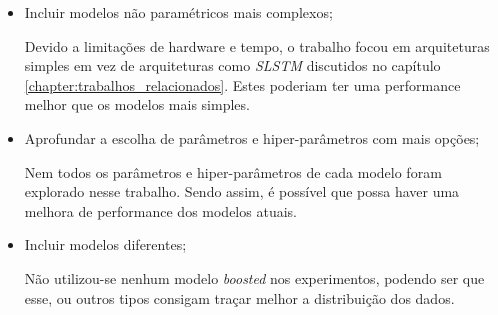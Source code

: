 \begin{itemize}
    \item Incluir modelos não paramétricos mais complexos;
    
    Devido a limitações de hardware e tempo, o trabalho focou em arquiteturas simples em vez de arquiteturas como \textit{\acrshort{SLSTM}} discutidos no capítulo \ref{chapter:trabalhos_relacionados}. Estes poderiam ter uma performance melhor que os modelos mais simples.
    
    \item Aprofundar a escolha de parâmetros e hiper-parâmetros com mais opções;
    
    Nem todos os parâmetros e hiper-parâmetros de cada modelo foram explorado nesse trabalho. Sendo assim, é possível que possa haver uma melhora de performance dos modelos atuais.
    
    \item Incluir modelos diferentes;
    
    Não utilizou-se nenhum modelo \textit{boosted} nos experimentos, podendo ser que esse, ou outros tipos consigam traçar melhor a distribuição dos dados.
    
\end{itemize}

